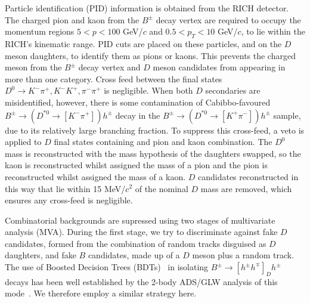 \documentclass[oneside,12pt]{article}
\begin{document}
Particle identification (PID) information is obtained from the RICH detector.
The charged pion and kaon from the $B^{\pm}$ decay vertex are required to occupy
the momentum regions $5 < p < 100$ GeV/$c$ and $0.5 < p_T < 10$ GeV/$c$, to lie
within the RICH's kinematic range. PID cuts are placed on these particles, and
on the $D$ meson daughters, to identify them as pions or kaons. This prevents
the charged meson from the $B^{\pm}$ decay vertex and $D$ meson candidates from
appearing in more than one category. Cross feed between the final states
$D^{0}\rightarrow K^-\pi^+, K^-K^+, \pi^-\pi^+$ is negligible. When both $D$
secondaries are misidentified, however, there is some contamination of
Cabibbo-favoured $B^{\pm}\rightarrow (D^{*0}\rightarrow [K^-\pi^+])h^{\pm}$
decay in the $B^{\pm}\rightarrow (D^{*0}\rightarrow [K^+\pi^-])h^{\pm}$ sample,
due to its relatively large branching fraction. To suppress this cross-feed, a
veto is applied to $D$ final states containing and pion and kaon combination.
The $D^0$ mass is reconstructed with the mass hypothesis of the daughters
swapped, so the kaon is reconstructed whilst assigned the mass of a pion and the
pion is reconstructed whilst assigned the mass of a kaon. $D$ candidates
reconstructed in this way that lie within 15 MeV/$c^2$ of the nominal $D$ mass
are removed, which ensures any cross-feed is negligible.

Combinatorial backgrounds are supressed using two stages of multivariate
analysis (MVA). During the first stage, we try to discriminate against fake $D$
candidates, formed from the combination of random tracks disguised as $D$
daughters, and fake $B$ candidates, made up of a $D$ meson plus a random track.
The use of Boosted Decision Trees (BDTs)~\cite{RegressionTrees} in isolating
$B^{\pm}\rightarrow [h^{\pm}h^{\mp}]_{D}h^{\pm}$ decays has been well
established by the 2-body ADS/GLW analysis of this mode~\cite{B2DKD2hh}. We
therefore employ a similar strategy here. 
\end{document}
